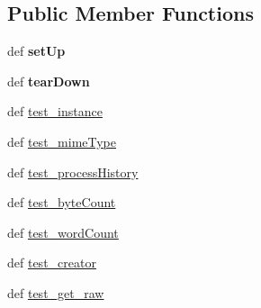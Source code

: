 \subsection*{Public Member Functions}
\begin{DoxyCompactItemize}
\item 
\hypertarget{classcheshire3_1_1test_1_1test_document_1_1_string_document_test_case_a51152e31bd9dd1c0f2d4e6800ebd4b9c}{def {\bfseries set\-Up}}\label{classcheshire3_1_1test_1_1test_document_1_1_string_document_test_case_a51152e31bd9dd1c0f2d4e6800ebd4b9c}

\item 
\hypertarget{classcheshire3_1_1test_1_1test_document_1_1_string_document_test_case_a8bea9fc17a640266ca18a7a5dbe0df2a}{def {\bfseries tear\-Down}}\label{classcheshire3_1_1test_1_1test_document_1_1_string_document_test_case_a8bea9fc17a640266ca18a7a5dbe0df2a}

\item 
def \hyperlink{classcheshire3_1_1test_1_1test_document_1_1_string_document_test_case_ae94be342dc2fc88f715b03e2aa5dd52f}{test\-\_\-instance}
\item 
def \hyperlink{classcheshire3_1_1test_1_1test_document_1_1_string_document_test_case_a58ec619f8e2c3273c6ff9e2ebc9c48fb}{test\-\_\-mime\-Type}
\item 
def \hyperlink{classcheshire3_1_1test_1_1test_document_1_1_string_document_test_case_ab9f0c996d914087f5a9d37067355763c}{test\-\_\-process\-History}
\item 
def \hyperlink{classcheshire3_1_1test_1_1test_document_1_1_string_document_test_case_a2e761f0156b7487bd29fac40bd05a308}{test\-\_\-byte\-Count}
\item 
def \hyperlink{classcheshire3_1_1test_1_1test_document_1_1_string_document_test_case_ad8f3a139875fced6b6f097a3c0a9f173}{test\-\_\-word\-Count}
\item 
def \hyperlink{classcheshire3_1_1test_1_1test_document_1_1_string_document_test_case_a98245f629a291cef36e58184c461c656}{test\-\_\-creator}
\item 
def \hyperlink{classcheshire3_1_1test_1_1test_document_1_1_string_document_test_case_a4baf2b77e4809925b8bd32bd54949f89}{test\-\_\-get\-\_\-raw}
\end{DoxyCompactItemize}
